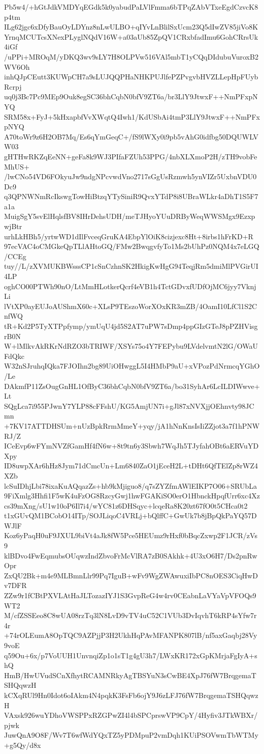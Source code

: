 Pb5w4/+hGtJdkVMDYqEGdk5k0yabudPaLVlFmma6bTPqZAbVTxeEgdCzvcK8p4tm
ILg62jgc6xDfyBauOyLDYnz8nLwULBO+qIYvLnBlilSxUcm23Q5dIwZV85jiVo8K
YrnqMCUTcsXNexPLyglNQdV16W+a03aUb85ZpQV1CRxbfadImu6GohCRrsUk4iGf
/uPPi+MROqM/yDKQ3wv9sLY7H8OLPVw516VAl5mbT1yCQqDIdubuVuroxB2WV6Oh
inhQJpCEutt3KUWpCH7a9sLUJQQPHaNHKPUJlfePZPvgvbHVZLLepHpFUybRcrpj
uq0j3Bc7Pc9MEp9Ouk8egSC36bhCqbN0bfV9ZT6a/br3LlY9JtwxF++NmPFxpNYQ
SRM58x+FyJ+5kHxapbfVvXWqtQ4Iwh1/KdUSbAi4tmP3LlY9JtwxF++NmPFxpNYQ
A70toWr9z6H2OB7Mq/Es6qYmGeqC+/fS9lWXy0i9pb5vAhG0idfbg50DQUWLVW03
gHTHwRKZqEeNN+geFa8k9WJ3PIfaFZUh53PPG/4nbXLXmoP2H/zTH9vobFeMhUS+
/lwCNo54VD6FOkyuJw9ndgNPcvwdVno2717sGgUsRzmwh5ynVIZr5UxbnVDU0Dc9
q3QPNWNmRcIkswgTowHiBtzqYTySiniR9QvxYTdP8i8UBraWLkr4aDhT1S5F7a1a
MuigSgY5svElHqlsfBV8IHrDehsUDH/meTJHyoYUuDRByWeqWWSMgx9EzxpwjBtr
urhLkHBh5/yrtwWD1dIlFvceqGruKA4EbpYlOiK8cizjexc8Ht+8irbs1hFrKD+R
97ecVAC4oCMGkeQpTLlAHtoGQ/FMw2BwqgvfyTo1Ms2bUhPz0NQM4x7eLGQ/CCEg
tuy//L/zXVMUKBWsssCP1cSnCzhnSK2HkigKwHgG94TeqjRm5dmiMlPVGirUI4LP
oghCO00PTWh90nO/LtMmHLotkerQcrf4eVB1h4TctGDvxfUDfOjMC6jyy7VknjLi
lVtXP0ayEUJoAUShmX60c+XLsP9TEszoWorXOxKR3mZB/4OamI10LfCl1S2CnfWQ
tR+Kd2P5TyXTPpfymp/ymUqU4jd5S2AT7uPW7sDmp4ppGIzGTeJ8pPZHVisgrB0N
W+lMlkvAkRKrNdRZO3bTRIWF/XSYs75o4Y7FEPybu9LVdelvmtN2lG/OWaUFdQkc
W32nSJruhqIQka7FJOIhn2bg89UiOHwggL5I4HMbP9aU+xVPozPdNrmcqYGhO/Le
DAkmfP11ZsOugGnHL1OfByC36bhCqbN0bfV9ZT6a/bo31SyhAr6LcILDIWwve+Lt
SQgLca7i955PJwnY7YLP88cFFshU/KG5AmjUN7i+gJl87xNVXjjOEhnvty98JCmn
+7KV17ATTDHSUm+nUzBpkRrmMmeY+yqy/jA1hNnKnsIsIiZZjot3a7f1hPNWRJ/Z
ICeEvp6wFYmNVZfGamHf4fN6w+8t9tn6y3Sbwh7WqJh5TJyfahOBt6aERVuYDXpy
ID8uwpXAr6hHz8Jym71dCmcUn+Lm6840ZaO1jEceH2L+tDHt6QfTElZp8rWZ4XZb
lcSuIDhjLbi78ixaKuAQqazZs+hb9kMjiguo8/q7sZYZfmAWlEIKP7O06+SRUbLa
9FiXmlg3Hhfi1F5wK4uFzOG8RzcyGwj1hwFGAKiSO0erO1HbnckHpqfUrr6xc4Xz
cs39mXng/sU1w10oP6Il7i4/wYC81z6DHSqyc+lcqeRa8K20zt67fO0t5CHca0t2
t1xGUvQM1BCobO14ITp/SOJLiqoC4VRLj+bQlffC+GwUk7b8jBpQkPaYQ57DWJlF
Koz6yPaqH0uF9JXUL9biVt4aJk8fW5Pce5HEUmz9rHxf0bBqcZxwp2F1JCR/zVs9
klBDvo4FwEqmubsOUqwzIndZbvoFrMcVlRA7zB0SAkhk+4U3xO6H7/Ds2pnRwOpr
ZxQU2Bk+m4e9MLBmnLlr99Pq7IguB+wFv9WgZWAwuxiIbPC8nOES3CiqHwDv7DFR
ZZw9r1fCBtPXVLAtHaJLTozazIYJ1S3GvpReG4w4rv0CEabnLaVYaVpVFOQs9WT2
M/cfZSSEeo8C8wUA08rzTq3lN8LvD9vTV4uC52C1VUb3DvIqvhT6kRP4sYfw7r4r
+74rOLEumA8OpTQC9AZPjjP3H2UkhHqPAvMFANPK807lB/nf5axGaqbj28Vy9voE
q59Ou+6x/p7VoUUH1UnvnqiZp1o1sT1g4gU3h7/LWxKR172xGpKMrjaFgIyA+shQ
HmB/HwUVudSCnXfhytRCAMNRkyAgTBSYuN3sCwBE4XpJ76fW7BrqgemaTSHQqwzH
kCXqRUl9Hn0Idot6oIAkm4N4pqkK3FsFb6ojY9J6zLFJ76fW7BrqgemaTSHQqwzH
VAxsk926wuYDhoVWSPPxRZGPwZI4l4bSPCprswVP9CpY/4Hyfiv3JTkWBXr/pjwk
JuwQnA9O8F/Wv7T6wfWdYQxTZ5yPDMpuP2vmDqh1KUiPSOVwmTbWTMy+g5Qy/d8x
